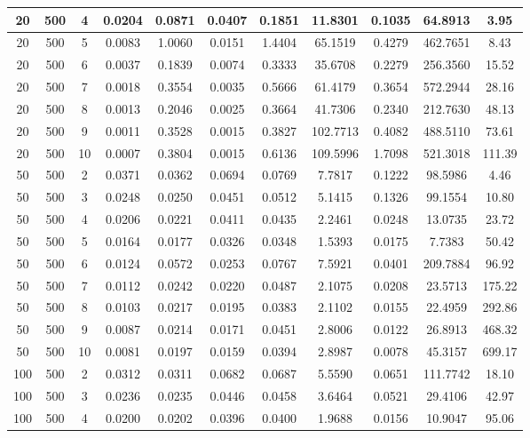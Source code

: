 \documentclass[11.5pt, twoside, a4paper]{article}
\begin{document}
\begin{table}
{\begin{tabular}{|c | c | c | c | c | c | c | c | c | c  | c | }
20 &	500 &	4 &	0.0204 &	0.0871 &	0.0407 &	0.1851 &	11.8301 &	0.1035 &	64.8913 &		3.95 \\ \hline
20 &	500 &	5 &	0.0083 &	1.0060 &	0.0151 &	1.4404 &	65.1519 &	0.4279 &	462.7651 &		8.43 \\ \hline
20 &	500 &	6 &	0.0037 &	0.1839 &	0.0074 &	0.3333 &	35.6708 &	0.2279 &	256.3560 &		15.52 \\ \hline
20 &	500 &	7 &	0.0018 &	0.3554 &	0.0035 &	0.5666 &	61.4179 &	0.3654 &	572.2944 &		28.16 \\ \hline
20 &	500 &	8 &	0.0013 &	0.2046 &	0.0025 &	0.3664 &	41.7306 &	0.2340 &	212.7630 &		48.13 \\ \hline
20 &	500 &	9 &	0.0011 &	0.3528 &	0.0015 &	0.3827 &	102.7713 &	0.4082 &	488.5110 &		73.61 \\ \hline
20 &	500 &	10 &	0.0007 &	0.3804 &	0.0015 &	0.6136 &	109.5996 &	1.7098 &	521.3018 &		111.39 \\ \hline
50 &	500 &	2 &	0.0371 &	0.0362 &	0.0694 &	0.0769 &	7.7817 &	0.1222 &	98.5986 &		4.46 \\ \hline
50 &	500 &	3 &	0.0248 &	0.0250 &	0.0451 &	0.0512 &	5.1415 &	0.1326 &	99.1554 &		10.80 \\ \hline
50 &	500 &	4 &	0.0206 &	0.0221 &	0.0411 &	0.0435 &	2.2461 &	0.0248 &	13.0735 &		23.72 \\ \hline
50 &	500 &	5 &	0.0164 &	0.0177 &	0.0326 &	0.0348 &	1.5393 &	0.0175 &	7.7383 &		50.42 \\ \hline
50 &	500 &	6 &	0.0124 &	0.0572 &	0.0253 &	0.0767 &	7.5921 &	0.0401 &	209.7884 &		96.92 \\ \hline
50 &	500 &	7 &	0.0112 &	0.0242 &	0.0220 &	0.0487 &	2.1075 &	0.0208 &	23.5713 &		175.22 \\ \hline
50 &	500 &	8 &	0.0103 &	0.0217 &	0.0195 &	0.0383 &	2.1102 &	0.0155 &	22.4959 &		292.86 \\ \hline
50 &	500 &	9 &	0.0087 &	0.0214 &	0.0171 &	0.0451 &	2.8006 &	0.0122 &	26.8913 &		468.32 \\ \hline
50 &	500 &	10 &	0.0081 &	0.0197 &	0.0159 &	0.0394 &	2.8987 &	0.0078 &	45.3157 &		699.17 \\ \hline
100 &	500 &	2 &	0.0312 &	0.0311 &	0.0682 &	0.0687 &	5.5590 &	0.0651 &	111.7742 &		18.10 \\ \hline
100 &	500 &	3 &	0.0236 &	0.0235 &	0.0446 &	0.0458 &	3.6464 &	0.0521 &	29.4106 &		42.97 \\ \hline
100 &	500 &	4 &	0.0200 &	0.0202 &	0.0396 &	0.0400 &	1.9688 &	0.0156 &	10.9047 &		95.06 \\ \hline

\end{tabular}}
\end{table}
\end{document}
